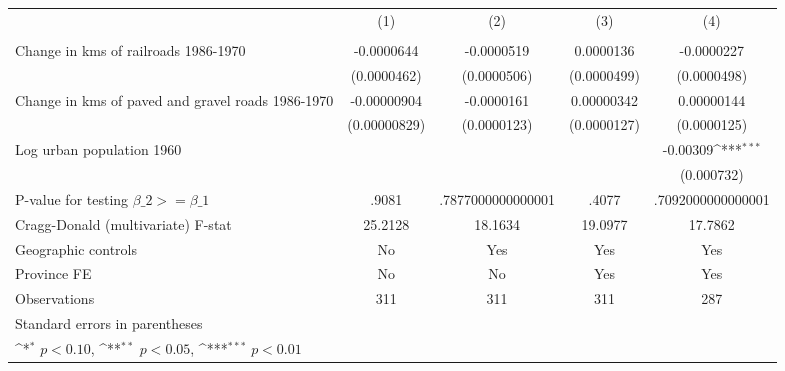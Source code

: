 {
\def\sym#1{\ifmmode^{#1}\else\(^{#1}\)\fi}
\begin{tabular}{l*{4}{c}}
\hline\hline
                &\multicolumn{1}{c}{(1)}&\multicolumn{1}{c}{(2)}&\multicolumn{1}{c}{(3)}&\multicolumn{1}{c}{(4)}\\
                &\multicolumn{1}{c}{}&\multicolumn{1}{c}{}&\multicolumn{1}{c}{}&\multicolumn{1}{c}{}\\
\hline
Change in kms of railroads 1986-1970&-0.0000644         &-0.0000519         &0.0000136         &-0.0000227         \\
                &(0.0000462)         &(0.0000506)         &(0.0000499)         &(0.0000498)         \\
[1em]
Change in kms of paved and gravel roads 1986-1970&-0.00000904         &-0.0000161         &0.00000342         &0.00000144         \\
                &(0.00000829)         &(0.0000123)         &(0.0000127)         &(0.0000125)         \\
[1em]
Log urban population 1960&                  &                  &                  & -0.00309\sym{***}\\
                &                  &                  &                  &(0.000732)         \\
\hline
P-value for testing $\beta\_{2} >= \beta\_{1}$&    .9081         &.7877000000000001         &    .4077         &.7092000000000001         \\
Cragg-Donald (multivariate) F-stat&  25.2128         &  18.1634         &  19.0977         &  17.7862         \\
Geographic controls&       No         &      Yes         &      Yes         &      Yes         \\
Province FE     &       No         &       No         &      Yes         &      Yes         \\
Observations    &      311         &      311         &      311         &      287         \\
\hline\hline
\multicolumn{5}{l}{\footnotesize Standard errors in parentheses}\\
\multicolumn{5}{l}{\footnotesize \sym{*} \(p<0.10\), \sym{**} \(p<0.05\), \sym{***} \(p<0.01\)}\\
\end{tabular}
}
